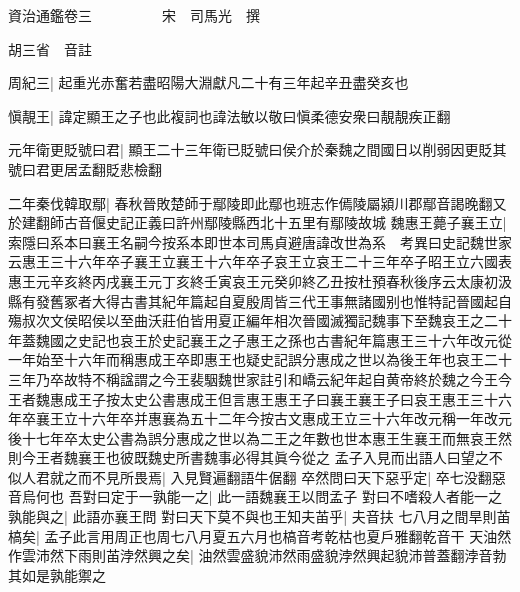 






























































資治通鑑卷三　　　　　宋　司馬光　撰

胡三省　音註

周紀三|{
	起重光赤奮若盡昭陽大淵獻凡二十有三年起辛丑盡癸亥也}


愼靚王|{
	諱定顯王之子也此複詞也諱法敏以敬曰愼柔德安衆曰靚靚疾正翻}


元年衛更貶號曰君|{
	顯王二十三年衛已貶號曰侯介於秦魏之間國日以削弱因更貶其號曰君更居孟翻貶悲檢翻}


二年秦伐韓取鄢|{
	春秋晉敗楚師于鄢陵即此鄢也班志作傿陵屬潁川郡鄢音謁晚翻又於建翻師古音偃史記正義曰許州鄢陵縣西北十五里有鄢陵故城}
魏惠王薨子襄王立|{
	索隱曰系本曰襄王名嗣今按系本即世本司馬貞避唐諱改世為系　考異曰史記魏世家云惠王三十六年卒子襄王立襄王十六年卒子哀王立哀王二十三年卒子昭王立六國表惠王元辛亥終丙戌襄王元丁亥終壬寅哀王元癸卯終乙丑按杜預春秋後序云太康初汲縣有發舊冢者大得古書其紀年篇起自夏殷周皆三代王事無諸國别也惟特記晉國起自殤叔次文侯昭侯以至曲沃莊伯皆用夏正編年相次晉國滅獨記魏事下至魏哀王之二十年蓋魏國之史記也哀王於史記襄王之子惠王之孫也古書紀年篇惠王三十六年改元從一年始至十六年而稱惠成王卒即惠王也疑史記誤分惠成之世以為後王年也哀王二十三年乃卒故特不稱諡謂之今王裴駰魏世家註引和嶠云紀年起自黄帝終於魏之今王今王者魏惠成王子按太史公書惠成王但言惠王惠王子曰襄王襄王子曰哀王惠王三十六年卒襄王立十六年卒并惠襄為五十二年今按古文惠成王立三十六年改元稱一年改元後十七年卒太史公書為誤分惠成之世以為二王之年數也世本惠王生襄王而無哀王然則今王者魏襄王也彼既魏史所書魏事必得其眞今從之}
孟子入見而出語人曰望之不似人君就之而不見所畏焉|{
	入見賢遍翻語牛倨翻}
卒然問曰天下惡乎定|{
	卒七没翻惡音烏何也}
吾對曰定于一孰能一之|{
	此一語魏襄王以問孟子}
對曰不嗜殺人者能一之孰能與之|{
	此語亦襄王問}
對曰天下莫不與也王知夫苖乎|{
	夫音扶}
七八月之間旱則苖槁矣|{
	孟子此言用周正也周七八月夏五六月也槁音考乾枯也夏戶雅翻乾音干}
天油然作雲沛然下雨則苖浡然興之矣|{
	油然雲盛貌沛然雨盛貌浡然興起貌沛普蓋翻浡音勃}
其如是孰能禦之

